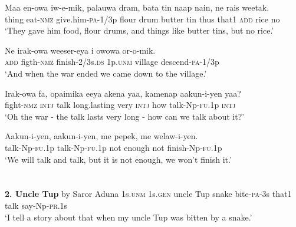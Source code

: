 {\ea\label{ex:a:x127}
\gll  Maa  en-owa  iw-e-mik,  palauwa  dram,    bata  tin  naap  nain,  ne  rais  weetak. \\
thing  eat-\textsc{nmz}  give.him-\textsc{pa}-1/3p  flour  drum   butter  tin  thus  that1  \textsc{add}  rice  no \\


\glt ‘They gave him food, flour drums, and things like butter tins, but no rice.’ \\
\z


\ea\label{ex:a:x128}
\gll  Ne  irak-owa  weeser-eya  i  owowa  or-o-mik. \\
\textsc{add}  figth-\textsc{nmz}  finish-2/3s.\textsc{ds}  1p.\textsc{unm}  village  descend-\textsc{pa}-1/3p \\
\glt ‘And when the war ended we came down to the village.’ \\
\z


\ea\label{ex:a:x129}
\gll  Irak-owa  fa,  opaimika  eeya  akena  yaa,  kamenap  aakun-i-yen  yaa? \\
fight-\textsc{nmz}  \textsc{intj}  talk  long.lasting  very  \textsc{intj}  how       talk-Np-\textsc{fu}.1p  \textsc{intj} \\


\glt ‘Oh the war - the talk lasts very long - how can we talk about it?’ \\
\z


\ea\label{ex:a:x130}
\gll  Aakun-i-yen,  aakun-i-yen,  me  pepek,  me  welaw-i-yen. \\
talk-Np-\textsc{fu}.1p  talk-Np-\textsc{fu}.1p  not  enough  not  finish-Np-\textsc{fu}.1p \\
\glt ‘We will talk and talk, but it is not enough, we won’t finish it.’ \\
\z


\section{}
\textbf{2.  Uncle Tup}  by Saror Aduna
\ea\label{ex:a:x1}
1s.\textsc{unm}  1s.\textsc{gen}  uncle  Tup  snake  bite-\textsc{pa}-3s  that1  talk  say-Np-\textsc{pr}.1s \\


\glt ‘I tell a story about that when my uncle Tup was bitten by a snake.’ \\
\z


}
